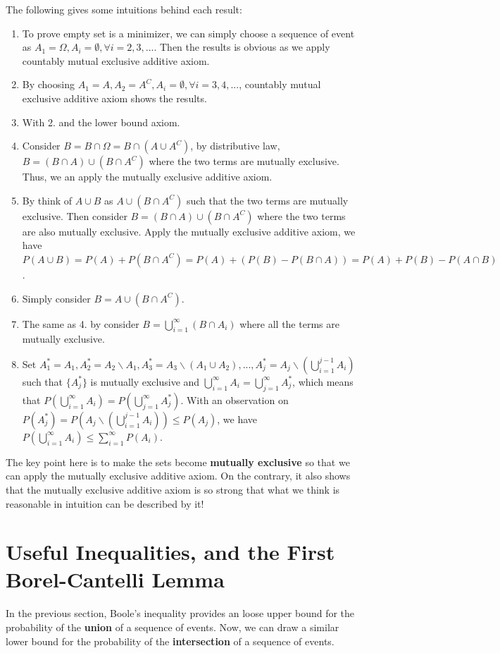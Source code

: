 \documentclass[11pt]{report}
\begin{document}
The following gives some intuitions behind each result:
\begin{enumerate}
	\item To prove empty set is a minimizer, we can simply choose a sequence of event as $A_1=\Omega,A_i=\emptyset,\forall i=2,3,...$. Then the results is obvious as we apply countably mutual exclusive additive axiom.
	\item By choosing $A_1=A,A_2=A^C,A_i=\emptyset,\forall i=3,4,...$, countably mutual exclusive additive axiom shows the results.
	\item With 2. and the lower bound axiom.
	\item Consider $B=B\cap\Omega=B\cap(A\cup A^C)$, by distributive law, $B=(B\cap A)\cup(B\cap A^C)$ where the two terms are mutually exclusive. Thus, we an apply the mutually exclusive additive axiom.
	\item By think of $A\cup B$ as $A\cup(B\cap A^C)$ such that the two terms are mutually exclusive. Then consider $B = (B\cap A)\cup(B\cap A^C)$ where the two terms are also mutually exclusive. Apply the mutually exclusive additive axiom, we have $P(A\cup B) = P(A) + P(B\cap A^C) = P(A) + (P(B) - P(B\cap A)) = P(A) + P(B) - P(A\cap B)$.
	\item Simply consider $B=A\cup(B\cap A^C)$.
	\item The same as 4. by consider $B=\bigcup_{i=1}^{\infty} (B\cap A_i)$ where all the terms are mutually exclusive.
	\item Set $A_1^* = A_1, A_2^* = A_2\backslash A_1, A_3^*=A_3\backslash(A_1\cup A_2),...,A_j^*=A_j\backslash(\bigcup_{i=1}^{j-1}A_i)$ such that $\{A_j^*\}$ is mutually exclusive and $\bigcup_{i=1}^{\infty}A_i=\bigcup_{j=1}^{\infty} A_j^*$, which means that $P(\bigcup_{i=1}^{\infty}A_i) = P(\bigcup_{j=1}^{\infty} A_j^*)$. With an observation on $P(A_j^*) = P(A_j\backslash(\bigcup_{i=1}^{j-1}A_i))\leq P(A_j)$, we have $P(\bigcup_{i=1}^{\infty}A_i)\leq\sum_{i=1}^{\infty}P(A_i)$.
\end{enumerate}

\begin{intuition}
	The key point here is to make the sets become {\bf mutually exclusive} so that we can apply the mutually exclusive additive axiom. On the contrary, it also shows that the mutually exclusive additive axiom is so strong that what we think is reasonable in intuition can be described by it!
\end{intuition}


\section{Useful Inequalities, and the First Borel-Cantelli Lemma}
In the previous section, Boole's inequality provides an loose upper bound for the probability of the {\bf union} of a sequence of events. Now, we can draw a similar lower bound for the probability of the {\bf intersection} of a sequence of events.
\end{document}
